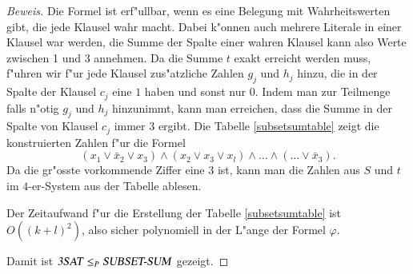 \begin{proof}[Beweis]
Die Formel ist erf"ullbar, wenn es eine Belegung mit Wahrheitswerten
gibt, die jede Klausel wahr macht. Dabei k"onnen auch mehrere Literale
in einer Klausel war werden, die Summe der Spalte einer wahren Klausel kann
also Werte zwischen 1 und 3 annehmen. Da die Summe $t$ exakt erreicht
werden muss, f"uhren wir f"ur jede Klausel zus"atzliche Zahlen $g_j$ und
$h_j$ hinzu, die in der Spalte der Klausel $c_j$ eine $1$ haben und sonst
nur $0$. Indem man zur Teilmenge falls n"otig $g_j$ und $h_j$ hinzunimmt,
kann man erreichen, dass die Summe in der Spalte von Klausel $c_j$ immer
$3$ ergibt.
Die Tabelle \ref{subsetsumtable} zeigt die konstruierten Zahlen
f"ur die Formel
\[
(x_1\vee \bar x_2\vee x_3)\wedge(x_2\vee x_3\vee x_l)\wedge \dots\wedge
(\dots\vee \bar x_3).
\]
Da die gr"osste vorkommende Ziffer eine $3$ ist, kann man die
Zahlen aus $S$  und $t$ im $4$-er-System aus der Tabelle ablesen.

Der Zeitaufwand f"ur die Erstellung der Tabelle \ref{subsetsumtable}
ist $O((k+l)^2)$, also sicher polynomiell in der L"ange der
Formel $\varphi$.

Damit ist 
$\text{\textsl{3SAT}}\le_P\text{\textsl{SUBSET-SUM}}$ gezeigt.
\end{proof}


